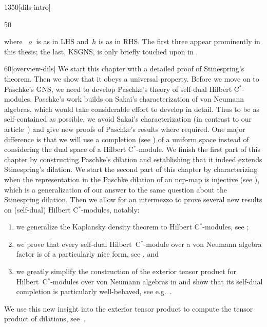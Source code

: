 \begin{parsec}{1350}[dils-intro]
\begin{point}{50}
\begin{center}
{        where~$\varrho$ is as in LHS
        and~$h$ is as in RHS.
    The first three appear prominently in this thesis;
        the last, KSGNS, is only briefly touched upon in .}
\end{center}
\begin{point}{60}[overview-dils]%
We start this chapter with a detailed proof of Stinespring's theorem.
Then we show that it obeys a universal property.
Before we move on to Paschke's GNS,
    we need to develop Paschke's theory of self-dual Hilbert C$^*$-modules.
Paschke's work builds on Sakai's characterization of von Neumann algebras,
    which would take considerable effort to develop in detail.
Thus to be as self-contained as possible,
    we avoid Sakai's characterization (in contrast to our
        article~\cite{wwpaschke})
    and give new proofs
    of Paschke's results where required.
One major difference is that we will use
    a completion (see ) of a uniform space
    instead of considering the dual space of a Hilbert C$^*$-module.
We finish the first part of this chapter
    by constructing Paschke's dilation
    and establishing that it indeed extends Stinespring's dilation.
We start the second part of this chapter
    by characterizing when the representation in the Paschke dilation
    of an ncp-map is injective (see ),
    which is a generalization of our answer \cite{stineinj}
    to the same question about the Stinespring dilation.
Then we allow for an intermezzo
    to prove several new results on (self-dual) Hilbert C$^*$-modules,
    notably:
\begin{enumerate}
    \item
    we generalize the Kaplansky density theorem
    to Hilbert C$^*$-modules, see ;
    \item
   we prove that every self-dual Hilbert~C$^*$-module over
            a von Neumann algebra factor
            is of a particularly nice form,
            see , and
    \item
    we greatly simplify the construction of the exterior tensor product
        for Hilbert~C$^*$-modules over von Neumann algebras
        in 
        and show that its self-dual completion
        is particularly well-behaved, see e.g.~.
\end{enumerate}
We use this new insight into the exterior tensor product
    to compute the tensor product
    of dilations, see~.

\end{point}
\end{point}
\end{parsec}
